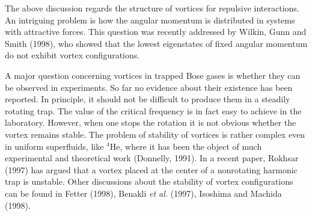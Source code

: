 The above discussion regards the structure of vortices for repulsive
interactions. An intriguing problem is how the angular momentum 
is distributed in systems with attractive forces. This question was
recently addressed by Wilkin, Gunn and Smith (1998), who showed
that the lowest eigenstates of fixed angular momentum do not exhibit 
vortex configurations. 

A major question concerning vortices in trapped Bose gases is whether
they can be observed in experiments.  So far no evidence about their
existence has been reported. In principle, it should not be difficult
to produce them in a steadily rotating trap. The value of the critical
frequency is in fact easy to achieve in the laboratory.  However, when one
stops the rotation it is not obvious whether the vortex remains stable. 
The problem of stability of vortices is rather complex even in uniform
superfluids, like $^4$He, where it has been the object of much
experimental and theoretical work (Donnelly, 1991). In a recent
paper, Rokhsar (1997) has argued that a vortex placed at the center of 
a nonrotating harmonic trap is unstable. Other discussions about the 
stability of vortex configurations can be found in Fetter (1998), Benakli
{\it et al.} (1997), Isoshima and Machida (1998). 

